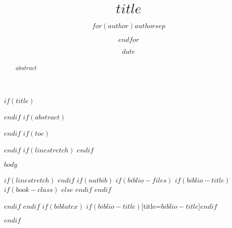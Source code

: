 \documentclass{humanist}
\title{$title$}
\author{$for(author)$$author$$sep$ \and $endfor$}
\date{$date$}
\makeatletter
\renewcommand\tableofcontents{%
    \@starttoc{toc}%
}
\makeatother
\begin{document}
$if(title)$
\maketitle
$endif$
$if(abstract)$
\begin{abstract}
$abstract$
\end{abstract}
$endif$
$if(toc)$
\tableofcontents
$endif$
$if(linestretch)$
$endif$

$body$

$if(linestretch)$
\singlespacing
$endif$
$if(natbib)$
$if(biblio-files)$
$if(biblio-title)$
$if(book-class)$
\renewcommand\bibname{$biblio-title$}
$else$
\renewcommand\refname{$biblio-title$}
$endif$
$endif$


 
$endif$
$endif$
$if(biblatex)$
\printbibliography$if(biblio-title)$[title=$biblio-title$]$endif$
 
$endif$
\end{document}

